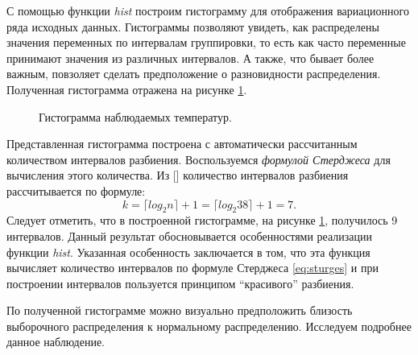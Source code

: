 С помощью функции \textit{hist} построим гистограмму для отображения вариационного ряда исходных данных. Гистограммы позволяют увидеть, как распределены значения переменных по интервалам группировки, то есть как часто переменные принимают значения из различных интервалов. А также, что бывает более важным, повзоляет сделать предположение о разновидности распределения. Полученная гистограмма отражена на рисунке \ref{img:histogram}. 
\begin{figure}[ht]
\caption{Гистограмма наблюдаемых температур.}
\label{img:histogram}
\end{figure}

Представленная гистограмма построена с автоматически рассчитанным количеством интервалов разбиения. Воспользуемся \textit{формулой Стерджеса} для вычисления этого количества. Из [] количество интервалов разбиения рассчитывается по формуле:
\begin{equation}
\label{eq:sturges}
	k = \lceil log_{2}n \rceil + 1 = \lceil log_{2}38 \rceil + 1 = 7.
\end{equation}
Следует отметить, что в построенной гистограмме, на рисунке \ref{img:histogram}, получилось 9 интервалов. Данный результат обосновывается особенностями реализации функции \textit{hist}. Указанная особенность заключается в том, что эта функция вычисляет количество интервалов по формуле Стерджеса \ref{eq:sturges} и при построении интервалов пользуется принципом ``красивого'' разбиения.

По полученной гистограмме можно визуально предположить близость выборочного распределения к нормальному распределению. Исследуем подробнее данное наблюдение.

